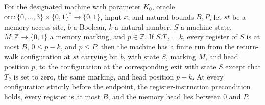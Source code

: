 \begin{theorem}
\label{Complexity.LogProg.ExpBFS.wb_run}
\leanok
{}
For the designated machine with parameter $K_0$, oracle
$\mathrm{orc}:\{0,\ldots,3\}\times\{0,1\}^*\to\{0,1\}$, input $x$, and natural bounds
$B,P$, let $st$ be a memory access site, $b$ a Boolean, $k$ a natural number, $S$ a
machine state, $M:\mathbb Z\to\{0,1\}$ a memory marking, and $p\in\mathbb Z$. If
$S.T_2=k$, every register of $S$ is at most $B$, $0\le p-k$, and $p\le P$, then the
machine has a finite run from the return-walk configuration at $st$ carrying bit $b$,
with state $S$, marking $M$, and head position $p$, to the configuration at the
corresponding exit with state $S$ except that $T_2$ is set to zero, the same marking,
and head position $p-k$. At every configuration strictly before the endpoint, the
register-instruction precondition holds, every register is at most $B$, and the memory
head lies between $0$ and $P$.
\end{theorem}

